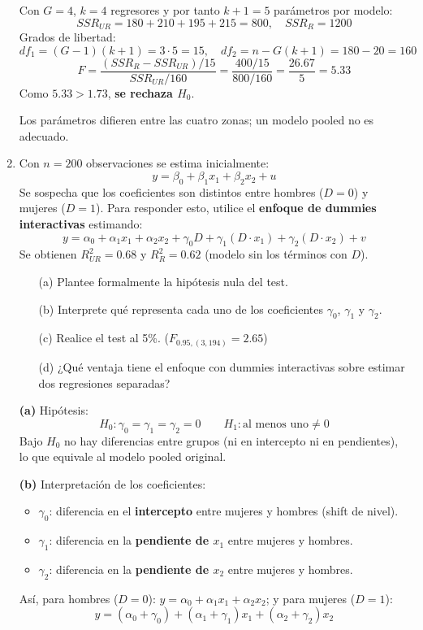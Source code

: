 \documentclass[11pt,a4paper]{article}
\begin{document}
\begin{enumerate}
Con $G=4$, $k=4$ regresores y por tanto $k+1=5$ parámetros por modelo:
\[
SSR_{UR} = 180+210+195+215 = 800, \quad SSR_R = 1200
\]
Grados de libertad:
\[
df_1 = (G-1)(k+1) = 3\cdot 5 = 15, \quad df_2 = n - G(k+1) = 180-20 = 160
\]
\[
F = \frac{(SSR_R - SSR_{UR})/15}{SSR_{UR}/160} = \frac{400/15}{800/160} = \frac{26.67}{5} = 5.33
\]
Como $5.33 > 1.73$, \textbf{se rechaza $H_0$}.

\begin{conclusion}
Los parámetros difieren entre las cuatro zonas; un modelo pooled no es adecuado.
\end{conclusion}




\item Con $n=200$ observaciones se estima inicialmente:
\[
y = \beta_0 + \beta_1 x_1 + \beta_2 x_2 + u
\]
Se sospecha que los coeficientes son distintos entre hombres ($D=0$) y mujeres ($D=1$). Para responder esto, utilice el \textbf{enfoque de dummies interactivas} estimando:
\[
y = \alpha_0 + \alpha_1 x_1 + \alpha_2 x_2 + \gamma_0 D + \gamma_1 (D \cdot x_1) + \gamma_2 (D \cdot x_2) + v
\]
Se obtienen $R^2_{UR} = 0.68$ y $R^2_R = 0.62$ (modelo sin los términos con $D$).
\begin{enumerate}
    \item[(a)] Plantee formalmente la hipótesis nula del test.
    \item[(b)] Interprete qué representa cada uno de los coeficientes $\gamma_0$, $\gamma_1$ y $\gamma_2$.
    \item[(c)] Realice el test al 5\%. ($F_{0.95,(3,194)}=2.65$)
    \item[(d)] ¿Qué ventaja tiene el enfoque con dummies interactivas sobre estimar dos regresiones separadas?
\end{enumerate}


\textbf{(a)} Hipótesis:
\[
H_0: \gamma_0 = \gamma_1 = \gamma_2 = 0 \qquad H_1: \text{al menos uno} \neq 0
\]
Bajo $H_0$ no hay diferencias entre grupos (ni en intercepto ni en pendientes), lo que equivale al modelo pooled original.

\textbf{(b)} Interpretación de los coeficientes:
\begin{itemize}[leftmargin=2em]
    \item $\gamma_0$: diferencia en el \textbf{intercepto} entre mujeres y hombres (shift de nivel).
    \item $\gamma_1$: diferencia en la \textbf{pendiente de $x_1$} entre mujeres y hombres.
    \item $\gamma_2$: diferencia en la \textbf{pendiente de $x_2$} entre mujeres y hombres.
\end{itemize}
Así, para hombres ($D=0$): $y = \alpha_0 + \alpha_1 x_1 + \alpha_2 x_2$; y para mujeres ($D=1$):
\[
y = (\alpha_0 + \gamma_0) + (\alpha_1 + \gamma_1) x_1 + (\alpha_2 + \gamma_2) x_2
\]


\end{enumerate}
\end{document}
